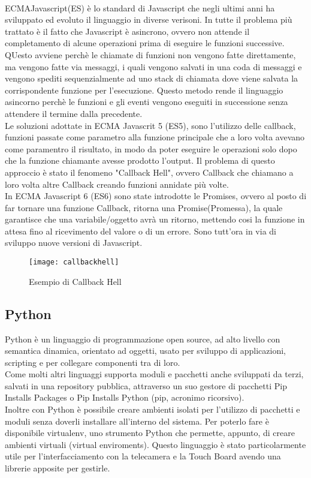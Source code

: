 \\[2\baselineskip]
ECMAJavascript(ES) \`e lo standard di Javascript che negli ultimi anni ha sviluppato ed evoluto il linguaggio in diverse verisoni.
In tutte il problema pi\`u trattato \`e il fatto che Javascript \`e asincrono, ovvero non attende il completamento di alcune
operazioni prima di eseguire le funzioni successive. QUesto avviene perch\`e le chiamate di funzioni non vengono fatte direttamente, ma vengono
fatte via messaggi, i quali vengono salvati in una coda di messaggi e vengono spediti sequenzialmente ad uno stack di chiamata dove
viene salvata la corrispondente funzione per l'esecuzione. Questo metodo rende il linguaggio asincorno perch\`e le funzioni e gli eventi
vengono eseguiti in successione senza attendere il termine dalla precedente.
\\[1\baselineskip]Le soluzioni adottate in ECMA Javascrit 5 (ES5), sono l'utilizzo delle callback,
funzioni passate come parametro alla funzione principale che a loro volta avevano come paramentro il risultato, in modo da poter eseguire le operazioni
solo dopo che la funzione chiamante avesse prodotto l'output. Il problema di questo approccio \`e stato il fenomeno "Callback Hell", ovvero Callback che chiamano a loro volta
altre Callback creando funzioni annidate pi\`u volte.
\\[1\baselineskip]
In ECMA Javascript 6 (ES6) sono state introdotte le Promises, ovvero al posto di far tornare una funzione Callback, ritorna una Promise(Promessa),
la quale garantisce che una variabile/oggetto avr\`a un ritorno, mettendo cosi la funzione in attesa fino al ricevimento del valore o di un errore.
Sono tutt'ora in via di sviluppo nuove versioni di Javascript.
\\[2\baselineskip]
\begin{figure}[h]
    \texttt{[image: callbackhell]}
    \caption{Esempio di Callback Hell}
\end{figure}

\subsection{Python}
Python \`e un linguaggio di programmazione open source, ad alto livello con semantica dinamica, orientato ad oggetti, usato
per sviluppo di applicazioni, scripting e per collegare componenti tra di loro.\\[1\baselineskip]
Come molti altri linguaggi supporta moduli e pacchetti anche sviluppati da terzi, salvati in una repository pubblica,
attraverso un suo gestore di pacchetti Pip Installs Packages o Pip Installs Python (pip, acronimo ricorsivo).
\\[1\baselineskip]
Inoltre con Python \`e possibile creare ambienti isolati per l'utilizzo di pacchetti e moduli senza doverli installare all'interno del sistema.
Per poterlo fare \`e disponibile virtualenv, uno strumento Python che permette, appunto, di creare ambienti virtuali (virtual enviroments).
Questo linguaggio \`e stato particolarmente utile per l'interfacciamento con la telecamera e la Touch Board avendo una librerie
apposite per gestirle.
\\[2\baselineskip]

